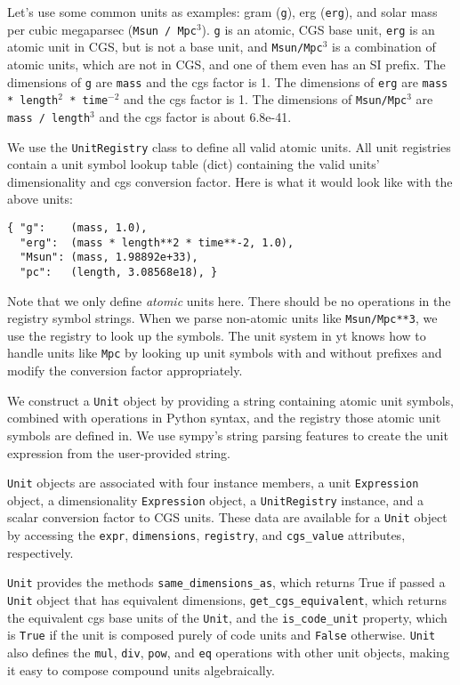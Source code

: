 Let's use some common units as examples: gram (\texttt{g}), erg (\texttt{erg}),
and solar mass per cubic megaparsec (\texttt{Msun / Mpc$^3$}). \texttt{g} is an
atomic, CGS base unit, \texttt{erg} is an atomic unit in CGS, but is not a base
unit, and \texttt{Msun/Mpc$^3$} is a combination of atomic units, which are not
in CGS, and one of them even has an SI prefix. The dimensions of \texttt{g} are
\texttt{mass} and the cgs factor is 1. The dimensions of \texttt{erg} are
\texttt{mass * length$^2$ * time$^{-2}$} and the cgs factor is 1. The dimensions
of \texttt{Msun/Mpc$^3$} are \texttt{mass / length$^3$} and the cgs factor is
about 6.8e-41.

We use the \texttt{UnitRegistry} class to define all valid atomic units.
All unit registries contain a unit symbol lookup table (dict) containing
the valid units' dimensionality and cgs conversion factor. Here is what
it would look like with the above units:

\begin{Verbatim}
{ "g":    (mass, 1.0),
  "erg":  (mass * length**2 * time**-2, 1.0),
  "Msun": (mass, 1.98892e+33),
  "pc":   (length, 3.08568e18), }
\end{Verbatim}

Note that we only define \emph{atomic} units here. There should be no
operations in the registry symbol strings. When we parse non-atomic
units like \texttt{Msun/Mpc**3}, we use the registry to look up the
symbols. The unit system in yt knows how to handle units like
\texttt{Mpc} by looking up unit symbols with and without prefixes and
modify the conversion factor appropriately.

We construct a \texttt{Unit} object by providing a string containing
atomic unit symbols, combined with operations in Python syntax, and the
registry those atomic unit symbols are defined in. We use sympy's string
parsing features to create the unit expression from the user-provided
string.

\texttt{Unit} objects are associated with four instance members, a unit
\texttt{Expression} object, a dimensionality \texttt{Expression} object,
a \texttt{UnitRegistry} instance, and a scalar conversion factor to CGS
units. These data are available for a \texttt{Unit} object by accessing
the \texttt{expr}, \texttt{dimensions}, \texttt{registry}, and
\texttt{cgs\_value} attributes, respectively.

\texttt{Unit} provides the methods \texttt{same\_dimensions\_as}, which
returns True if passed a \texttt{Unit} object that has equivalent
dimensions, \texttt{get\_cgs\_equivalent}, which returns the equivalent
cgs base units of the \texttt{Unit}, and the \texttt{is\_code\_unit}
property, which is \texttt{True} if the unit is composed purely of code
units and \texttt{False} otherwise. \texttt{Unit} also defines the
\texttt{mul}, \texttt{div}, \texttt{pow}, and \texttt{eq} operations
with other unit objects, making it easy to compose compound units
algebraically.

